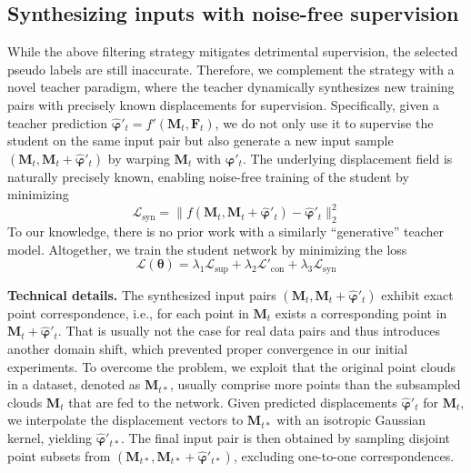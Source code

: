 \documentclass[runningheads]{llncs}
\begin{document}
\subsection{Synthesizing inputs with noise-free supervision}
\label{sec:generative_mt}
While the above filtering strategy mitigates detrimental supervision, the selected pseudo labels are still inaccurate.
Therefore, we complement the strategy with a novel teacher paradigm, where the teacher dynamically synthesizes new training pairs with precisely known displacements for supervision.
Specifically, given a teacher prediction $\hat{\boldsymbol{\varphi}}'_t=f'(\boldsymbol{M}_t,\boldsymbol{F}_t)$, we do not only use it to supervise the student on the same input pair but also generate a new input sample $(\boldsymbol{M}_t,\boldsymbol{M}_t+\hat{\boldsymbol{\varphi}}'_t)$ by warping $\boldsymbol{M}_t$ with $\hat{\boldsymbol{\varphi}}'_t$.
The underlying displacement field is naturally precisely known, enabling noise-free training of the student by minimizing
\begin{equation}
    \mathcal{L}_\mathrm{syn}=\|f(\boldsymbol{M}_t,\boldsymbol{M}_t+\hat{\boldsymbol{\varphi}}'_t)-\hat{\boldsymbol{\varphi}}'_t\|^2_2
\end{equation}
To our knowledge, there is no prior work with a similarly ``generative'' teacher model.
Altogether, we train the student network by minimizing the loss
\begin{equation}
\label{eq:total_loss}
    \mathcal{L}(\boldsymbol{\theta})=\lambda_1\mathcal{L}_{\mathrm{sup}}+\lambda_2\mathcal{L}'_{\mathrm{con}}+\lambda_3\mathcal{L}_{\mathrm{syn}}
\end{equation}

\textbf{Technical details.}
The synthesized input pairs $(\boldsymbol{M}_t,\boldsymbol{M}_t+\hat{\boldsymbol{\varphi}}'_t)$ exhibit exact point correspondence, i.e., for each point in $\boldsymbol{M}_t$ exists a corresponding point in $\boldsymbol{M}_t+\hat{\boldsymbol{\varphi}}'_t$.
That is usually not the case for real data pairs and thus introduces another domain shift, which prevented proper convergence in our initial experiments.
To overcome the problem, we exploit that the original point clouds in a dataset, denoted as $\boldsymbol{M}_{t*}$, usually comprise more points than the subsampled clouds $\boldsymbol{M}_t$ that are fed to the network.
Given predicted displacements $\hat{\boldsymbol{\varphi}}'_t$ for $\boldsymbol{M}_t$, we interpolate the displacement vectors to $\boldsymbol{M}_{t*}$ with an isotropic Gaussian kernel, yielding $\hat{\boldsymbol{\varphi}}'_{t*}$.
The final input pair is then obtained by sampling disjoint point subsets from $(\boldsymbol{M}_{t*},\boldsymbol{M}_{t*}+\hat{\boldsymbol{\varphi}}'_{t*})$, excluding one-to-one correspondences.
\end{document}
